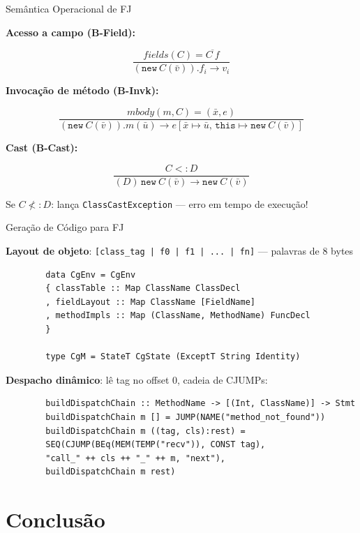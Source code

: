 \begin{frame}[fragile]{Semântica Operacional de FJ}

    \textbf{Acesso a campo (B-Field):}

    \[\frac{\mathit{fields}(C) = \overline{C\ f}}{(\mathtt{new}\ C(\bar{v})).f_i \to v_i}\]

    \textbf{Invocação de método (B-Invk):}

    \[\frac{\mathit{mbody}(m, C) = (\bar{x}, e)}{(\mathtt{new}\ C(\bar{v})).m(\bar{u}) \to e[\bar{x} \mapsto \bar{u},\, \mathtt{this} \mapsto \mathtt{new}\ C(\bar{v})]}\]

    \textbf{Cast (B-Cast):}

    \[\frac{C <: D}{(D)\, \mathtt{new}\ C(\bar{v}) \to \mathtt{new}\ C(\bar{v})}\]

    Se \(C \not<: D\): lança \texttt{ClassCastException}
    --- erro em tempo de execução!
\end{frame}

\begin{frame}[fragile]{Geração de Código para FJ}

    \textbf{Layout de objeto}:
    \texttt{[class\_tag | f0 | f1 | ... | fn]} --- palavras
    de 8 bytes

    \begin{lstlisting}
        data CgEnv = CgEnv
        { classTable :: Map ClassName ClassDecl
        , fieldLayout :: Map ClassName [FieldName]
        , methodImpls :: Map (ClassName, MethodName) FuncDecl
        }

        type CgM = StateT CgState (ExceptT String Identity)
    \end{lstlisting}

    \textbf{Despacho dinâmico}: lê tag no offset 0, cadeia de CJUMPs:

    \begin{lstlisting}
        buildDispatchChain :: MethodName -> [(Int, ClassName)] -> Stmt
        buildDispatchChain m [] = JUMP(NAME("method_not_found"))
        buildDispatchChain m ((tag, cls):rest) =
        SEQ(CJUMP(BEq(MEM(TEMP("recv")), CONST tag),
        "call_" ++ cls ++ "_" ++ m, "next"),
        buildDispatchChain m rest)
    \end{lstlisting}
\end{frame}


\section{Conclusão}\label{conclusuxe3o}


